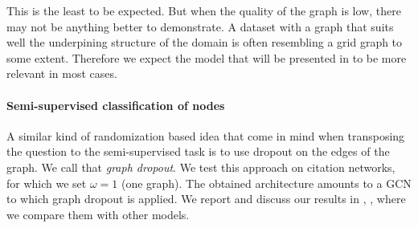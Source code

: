 This is the least to be expected. But when the quality of the graph is low, there may not be anything better to demonstrate. A dataset with a graph that suits well the underpining structure of the domain is often resembling a grid graph to some extent. Therefore we expect the model that will be presented in  to be more relevant in most cases.

\paragraph{Semi-supervised classification of nodes}

A similar kind of randomization based idea that come in mind when transposing the question to the semi-supervised task is to use dropout on the edges of the graph. We call that \emph{graph dropout}. We test this approach on citation networks, for which we set $\omega = 1$ (\ie one graph). The obtained architecture amounts to a GCN \citep{kipf2016semi} to which graph dropout is applied. We report and discuss our results in , , where we compare them with other models.





